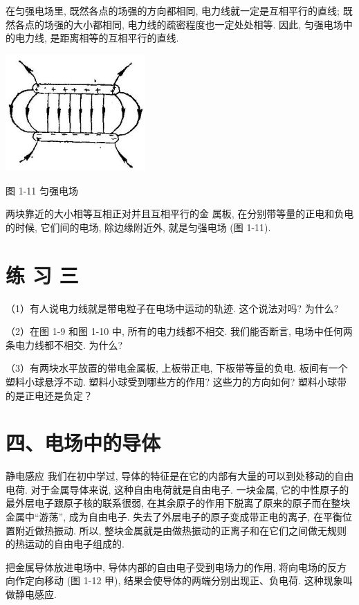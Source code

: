 \documentclass[10pt]{article}
\begin{document}
在匀强电场里, 既然各点的场强的方向都相同, 电力线就一定是互相平行的直线; 既然各点的场强的大小都相同, 电力线的疏密程度也一定处处相等. 因此, 匀强电场中的电力线, 是距离相等的互相平行的直线.

\begin{center}
\includegraphics[max width=0.4\textwidth]{images/01913056-1f15-74d8-9184-9aab52c9d66b_24_754090.jpg}
\end{center}

图 1-11 匀强电场

两块靠近的大小相等互相正对并且互相平行的金 属板, 在分别带等量的正电和负电的时候, 它们间的电场, 除边缘附近外, 就是匀强电场 (图 1-11).

\section*{练 习 三}

（1）有人说电力线就是带电粒子在电场中运动的轨迹. 这个说法对吗? 为什么?

（2）在图 1-9 和图 1-10 中, 所有的电力线都不相交. 我们能否断言, 电场中任何两条电力线都不相交. 为什么?

（3）有两块水平放置的带电金属板, 上板带正电, 下板带等量的负电. 板间有一个塑料小球悬浮不动. 塑料小球受到哪些方的作用? 这些力的方向如何? 塑料小球带的是正电还是负定？

\section*{四、电场中的导体}

静电感应 我们在初中学过, 导体的特征是在它的内部有大量的可以到处移动的自由电荷. 对于金属导体来说, 这种自由电荷就是自由电子. 一块金属, 它的中性原子的最外层电子跟原子核的联系很弱, 在其余原子的作用下脱离了原来的原子而在整块金属中“游荡”, 成为自由电子. 失去了外层电子的原子变成带正电的离子, 在平衡位置附近做热振动. 所以, 整块金属就是由做热振动的正离子和在它们之间做无规则的热运动的自由电子组成的.

把金属导体放进电场中, 导体内部的自由电子受到电场力的作用, 将向电场的反方向作定向移动 (图 1-12 甲), 结果会使导体的两端分别出现正、负电荷. 这种现象叫做静电感应.
\end{document}
